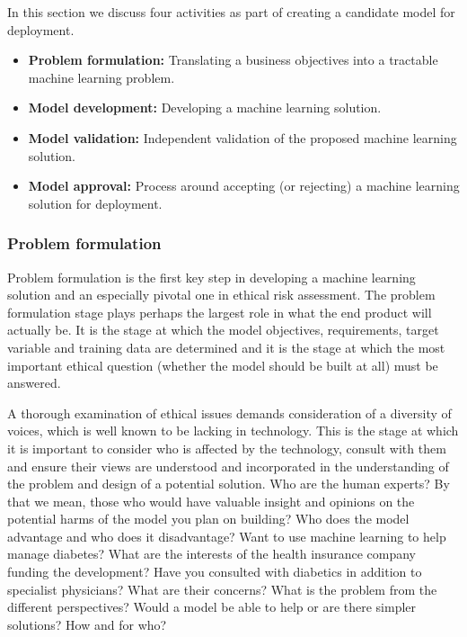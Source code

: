 In this section we discuss four activities as part of creating a candidate model for deployment.
%
\begin{itemize}[leftmargin=*]
\item \textbf{Problem formulation:} Translating a business objectives into a tractable machine learning problem.
\item \textbf{Model development:} Developing a machine learning solution.
\item \textbf{Model validation:} Independent validation of the proposed machine learning solution.
\item \textbf{Model approval:} Process around accepting (or rejecting) a machine learning solution for deployment.
\end{itemize}

\subsubsection*{Problem formulation}

Problem formulation is the first key step in developing a machine learning solution and an especially pivotal one in ethical risk assessment. The problem formulation stage plays perhaps the largest role in what the end product will actually be. It is the stage at which the model objectives, requirements, target variable and training data are determined and it is the stage at which the most important ethical question (whether the model should be built at all) must be answered.

A thorough examination of ethical issues demands consideration of a diversity of voices, which is well known to be lacking in technology. This is the stage at which it is important to consider who is affected by the technology, consult with them and ensure their views are understood and incorporated in the understanding of the problem and design of a potential solution. Who are the human experts? By that we mean, those who would have valuable insight and opinions on the potential harms of the model you plan on building? Who does the model advantage and who does it disadvantage? Want to use machine learning to help manage diabetes? What are the interests of the health insurance company funding the development? Have you consulted with diabetics in addition to specialist physicians? What are their concerns? What is the problem from the different perspectives? Would a model be able to help or are there simpler solutions? How and for who?


